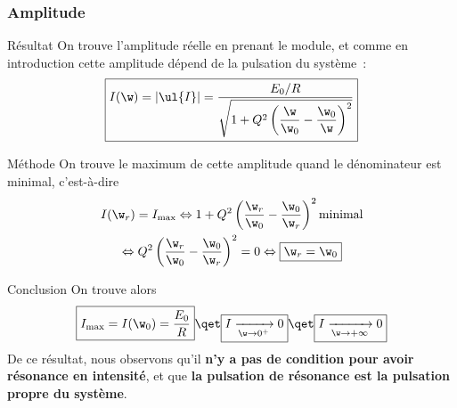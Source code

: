 \documentclass[../main/main.tex]{subfiles}
\begin{document}
\subsubsection{Amplitude}

\begin{rprop}{Résultat}
    On trouve l'amplitude réelle en prenant le module, et comme en introduction
    cette amplitude dépend de la pulsation du système~:
    \[\boxed{
            I(\w)
            = \left| \ul{I} \right|
            = \frac{E_0/R}{\sqrt{1 + Q^2\left( \dfrac{\w}{\w_0} - \dfrac{\w_0}{\w}
            \right)^2}}
    }\]
\end{rprop}
\begin{rdemo}{Méthode}
    On trouve le maximum de cette amplitude quand le dénominateur est minimal,
    c'est-à-dire
    \begin{gather*}
        I(\w_r) = I_{\max}
        \Leftrightarrow
        1 + Q^2\left( \frac{\w_r}{\w_0} - \frac{\w_0}{\w_r} \right)^2 \text{minimal}\\
        \Leftrightarrow
        Q^2\left( \frac{\w_r}{\w_0} - \frac{\w_0}{\w_r} \right)^2 = 0
        \Leftrightarrow
        \boxed{\w_r = \w_0}
    \end{gather*}
\end{rdemo}
\begin{rror}{Conclusion}
    On trouve alors
    \[\boxed{
            I_{\max} = I(\w_0) = \frac{E_0}{R}
    }
    \qet
    \boxed{
        I\xrightarrow[\w\rightarrow0^+]{} 0}
    \qet
    \boxed{
        I\xrightarrow[\w\rightarrow+\infty]{} 0}
    \]
    De ce résultat, nous observons qu'il \textbf{n'y a pas de condition pour avoir
    résonance en intensité}, et que \textbf{la pulsation de résonance est la
    pulsation propre du système}.
\end{rror}

\vspace{-20pt}
\end{document}
